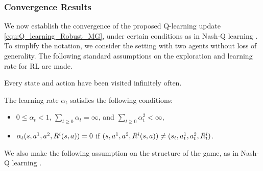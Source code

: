 \subsubsection{Convergence Results}
We now establish the convergence of the  proposed Q-learning update \eqref{equ:Q_learning_Robust_MG}, under certain conditions as in Nash-Q learning \citep{hu2003nash}. 
To simplify the notation, we consider the setting with two agents without loss of generality. The following standard assumptions on the exploration and learning rate for RL are made.

\begin{assumption}\label{assump:visit}
	Every state and action have been visited infinitely often.
\end{assumption}

\begin{assumption}\label{assump:stepsize}
	The learning rate $\alpha_t$ satisfies the following conditions:
	\begin{itemize}
		\item $0\leq \alpha_t< 1$, $\sum_{t\geq 0}\alpha_t=\infty$, and $\sum_{t\geq 0}\alpha_t^2<\infty$,
		\item $\alpha_t(s,a^1,a^2,\bar{R}^i(s,a))=0$ if $(s,a^1,a^2,\bar{R}^i(s,a))\neq (s_t,a^1_t,a^2_t,\bar{R}^i_t)$.
	\end{itemize}
\end{assumption}

We also make the following assumption on the structure of the game, as in Nash-Q learning \citep{hu2003nash}.

